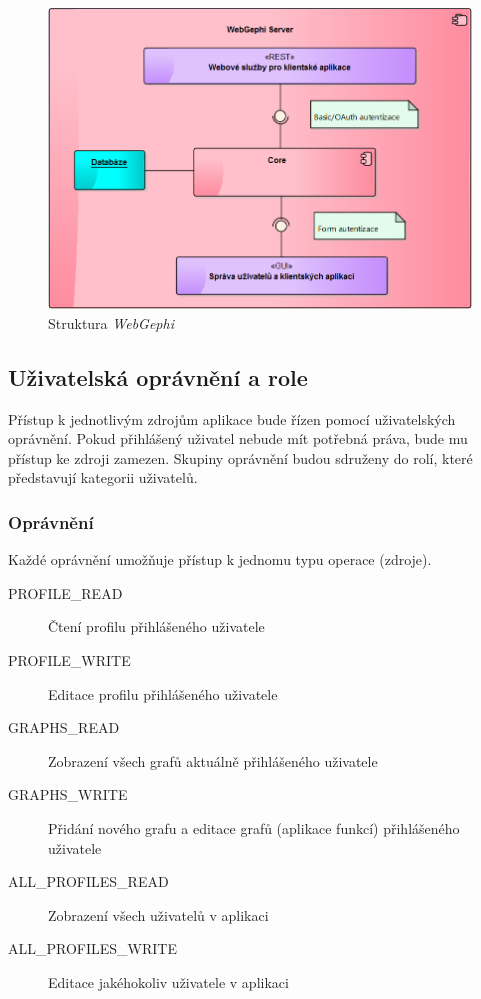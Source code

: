 \documentclass[thesis=M,czech]{FITthesis}[2014/05/6]
\begin{document}
\begin{figure}\centering
 	\includegraphics[width=1\textwidth]{images/diagram/server-auth}
 	\caption[Struktura WebGephi]{Struktura \textit{WebGephi}}\label{fig:server-auth}
\end{figure}

\subsection{Uživatelská oprávnění a role}
Přístup k jednotlivým zdrojům aplikace bude řízen pomocí uživatelských oprávnění. Pokud přihlášený uživatel nebude mít potřebná práva,
bude mu přístup ke zdroji zamezen. Skupiny oprávnění budou sdruženy do rolí, které představují kategorii uživatelů.

\subsubsection{Oprávnění}
Každé oprávnění umožňuje přístup k jednomu typu operace (zdroje).
\begin{description}
  \item[PROFILE\_READ] Čtení profilu přihlášeného uživatele
  \item[PROFILE\_WRITE] Editace profilu přihlášeného uživatele
  \item[GRAPHS\_READ] Zobrazení všech grafů aktuálně přihlášeného uživatele
  \item[GRAPHS\_WRITE] Přidání nového grafu a editace grafů (aplikace funkcí) přihlášeného uživatele 
  \item[ALL\_PROFILES\_READ] Zobrazení všech uživatelů v aplikaci 
  \item[ALL\_PROFILES\_WRITE] Editace jakéhokoliv uživatele v aplikaci 
\end{description}
\end{document}
